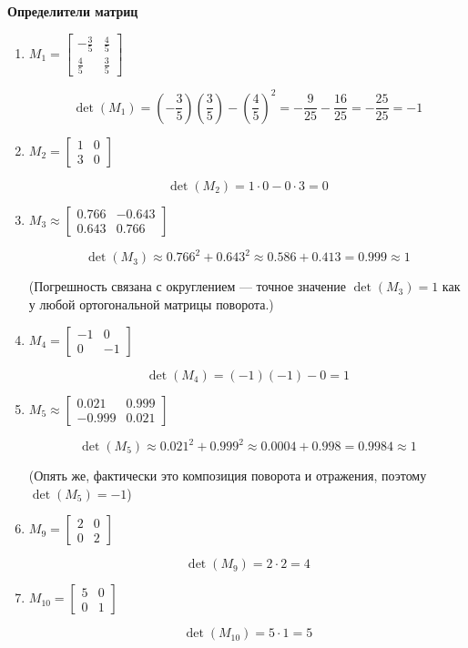 \textbf{Определители матриц}

\begin{enumerate}
  \item $M_1 = 
  \begin{bmatrix}
    -\frac{3}{5} & \frac{4}{5} \\
    \frac{4}{5} & \frac{3}{5}
  \end{bmatrix}$

  \[
    \det(M_1) = \left(-\frac{3}{5}\right)\left(\frac{3}{5}\right) - \left(\frac{4}{5}\right)^2 =
    -\frac{9}{25} - \frac{16}{25} = -\frac{25}{25} = -1
  \]

  \item $M_2 = 
  \begin{bmatrix}
    1 & 0 \\
    3 & 0
  \end{bmatrix}$

  \[
    \det(M_2) = 1 \cdot 0 - 0 \cdot 3 = 0
  \]

  \item $M_3 \approx 
  \begin{bmatrix}
    0.766 & -0.643 \\
    0.643 & 0.766
  \end{bmatrix}$

  \[
    \det(M_3) \approx 0.766^2 + 0.643^2 \approx 0.586 + 0.413 = 0.999 \approx 1
  \]

  (Погрешность связана с округлением — точное значение $\det(M_3) = 1$ как у любой ортогональной матрицы поворота.)

  \item $M_4 = 
  \begin{bmatrix}
    -1 & 0 \\
    0 & -1
  \end{bmatrix}$

  \[
    \det(M_4) = (-1)(-1) - 0 = 1
  \]

  \item $M_5 \approx 
  \begin{bmatrix}
    0.021 & 0.999 \\
    -0.999 & 0.021
  \end{bmatrix}$

  \[
    \det(M_5) \approx 0.021^2 + 0.999^2 \approx 0.0004 + 0.998 = 0.9984 \approx 1
  \]

  (Опять же, фактически это композиция поворота и отражения, поэтому $\det(M_5) = -1$)

  \item $M_9 = 
  \begin{bmatrix}
    2 & 0 \\
    0 & 2
  \end{bmatrix}$

  \[
    \det(M_9) = 2 \cdot 2 = 4
  \]

  \item $M_{10} = 
  \begin{bmatrix}
    5 & 0 \\
    0 & 1
  \end{bmatrix}$

  \[
    \det(M_{10}) = 5 \cdot 1 = 5
  \]
\end{enumerate}

